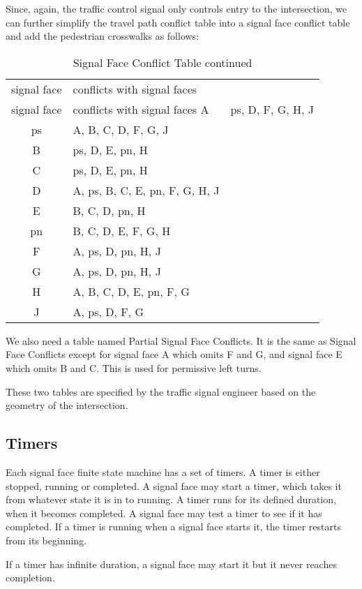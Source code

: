 \documentclass[letterpaper,twoside]{article}
\begin{document}
Since, again, the traffic control signal only controls entry to the
intersection,
we can further simplify the travel path conflict table into a signal face
conflict table and add the pedestrian crosswalks as follows:

\begin{longtable}{c | l}
  \caption{Signal Face Conflict Table} \\
  signal face & conflicts with signal faces \endfirsthead
  \caption{Signal Face Conflict Table continued} \\
  signal face & conflicts with signal faces \endhead
  \hline
  A & ps, D, F, G, H, J \\
  ps & A, B, C, D, F, G, J \\
  B & ps, D, E, pn, H \\
  C & ps, D, E, pn, H \\
  D & A, ps, B, C, E, pn, F, G, H, J \\
  E & B, C, D, pn, H \\
  pn & B, C, D, E, F, G, H \\
  F & A, ps, D, pn, H, J \\
  G & A, ps, D, pn, H, J \\
  H & A, B, C, D, E, pn, F, G \\
  J & A, ps, D, F, G \\
\end{longtable}

We also need a table named Partial Signal Face Conflicts.  It is the same
as Signal Face Conflicts except for signal face A which omits F and G,
and signal face E which omits B and C.  This is used for permissive
left turns.

These two tables are specified by the traffic signal engineer
based on the geometry of the intersection.

\subsection{Timers}

Each signal face finite state machine has a set of timers.
A timer is either stopped, running
or completed.  A signal face may start a timer, which takes it from
whatever state it is in to running.  A timer runs for its defined duration,
when it becomes completed.  A signal face may test a timer to see if
it has completed.  If a timer is running when a signal face starts it,
the timer restarts from its beginning.

If a timer has infinite duration, a signal face may start it but
it never reaches completion.
\end{document}
